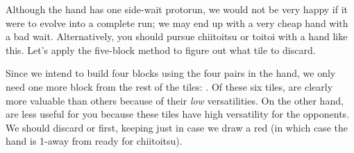 \bigskip
\noindent Although the hand has one side-wait protorun, we would not be very happy if it were to evolve into a complete run; we may end up with a very cheap hand with a bad wait. Alternatively, you should pursue {\jap chiitoitsu} or {\jap toitoi} with a hand like this. Let's apply the five-block method to figure out what tile to discard.

\emj
Since we intend to build four blocks using the four pairs in the hand, we only need one more block from the rest of the tiles: {\LARGE{}\dong\nan}. Of these six tiles, {\LARGE\dong\nan{}} are clearly more valuable than others because of their \emph{low} versatilities. On the other hand, {\LARGE{}} are less useful for you because these tiles have high versatility for the opponents. We should discard {\LARGE{}} or {\LARGE{}} first, keeping {\LARGE{}} just in case we draw a red {\LARGE\rfd} (in which case the hand is 1-away from ready for {\jap chiitoitsu}).




